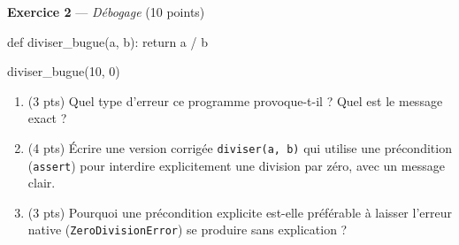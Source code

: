 \textbf{Exercice 2} --- \textit{Débogage} \hfill (10 points)

\begin{python}
def diviser_bugue(a, b):
    return a / b

diviser_bugue(10, 0)
\end{python}

\begin{enumerate}
  \item (3 pts) Quel type d'erreur ce programme provoque-t-il ? Quel est le message exact ?
  \item (4 pts) Écrire une version corrigée \lstinline{diviser(a, b)} qui utilise une précondition (\lstinline{assert}) pour interdire explicitement une division par zéro, avec un message clair.
  \item {\raggedright (3 pts) Pourquoi une précondition explicite est-elle préférable à laisser l'erreur native (\lstinline{ZeroDivisionError}) se produire sans explication ?\par}
\end{enumerate}

